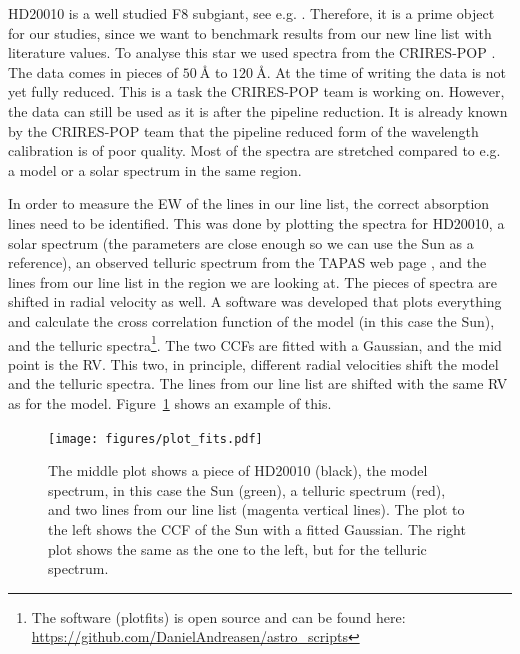 \documentclass{aa}
\begin{document}
HD20010 is a well studied F8 subgiant, see e.g.
\cite{Mortier2013,lebzelter2012}. Therefore, it is a prime object for
our studies, since we want to benchmark results from our new line list
with literature values. To analyse this star we used spectra from
the CRIRES-POP \citep{lebzelter2012}. The data comes in pieces of
$\SI{50}{\angstrom}$ to $\SI{120}{\angstrom}$. At the time of writing
the data is not yet fully reduced. This is a task the CRIRES-POP team
is working on. However, the data can still be used as it is after the
pipeline reduction. It is already known by the CRIRES-POP team that the
pipeline reduced form of the wavelength calibration is of poor quality.
Most of the spectra are stretched compared to e.g. a model or a solar
spectrum in the same region.

In order to measure the EW of the lines in our line list, the correct
absorption lines need to be identified. This was done by plotting
the spectra for HD20010, a solar spectrum (the parameters are close
enough so we can use the Sun as a reference), an observed telluric
spectrum from the TAPAS web page \citep{TAPAS}, and the lines from our
line list in the region we are looking at. The pieces of spectra are
shifted in radial velocity as well. A software was developed that plots
everything and calculate the cross correlation function of the model
(in this case the Sun), and the telluric spectra\footnote{The software
(plot\textunderscore{}fits) is open source and can be found here:
\url{https://github.com/DanielAndreasen/astro_scripts}}. The two CCFs
are fitted with a Gaussian, and the mid point is the RV. This two, in
principle, different radial velocities shift the model and the telluric
spectra. The lines from our line list are shifted with the same RV as for
the model. Figure~\ref{fig:plot_fits} shows an example of this.

\begin{figure}[htbp!]
    \centering
    \texttt{[image: figures/plot\_fits.pdf]}
    \caption{The middle plot shows a piece of HD20010 (black), the model
    spectrum, in this case the Sun (green), a telluric spectrum (red), and two
    lines from our line list (magenta vertical lines). The plot to the left
    shows the CCF of the Sun with a fitted Gaussian. The right plot shows the
    same as the one to the left, but for the telluric spectrum.}
    \label{fig:plot_fits}
\end{figure}
\end{document}
